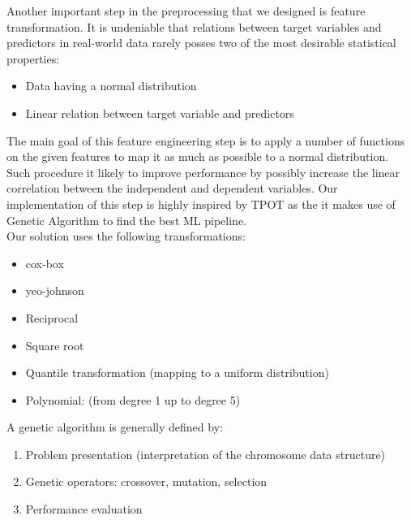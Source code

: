 \documentclass[conference]{IEEEtran}
\begin{document}
Another important step in the preprocessing that we designed is feature transformation. It is undeniable that relations between target variables and predictors in real-world data rarely posses two of the most desirable statistical properties:
\begin{itemize}
	\item Data having a normal distribution
	\item Linear relation between target variable and predictors
\end{itemize}
The main goal of this feature engineering step is to apply a number of functions on the given features to map it as much as possible to a normal distribution. Such procedure it likely to improve performance by possibly increase the linear correlation between the independent and dependent variables. Our implementation of this step is highly inspired by TPOT as the it makes use of Genetic Algorithm to find the best ML pipeline.\\

Our solution uses the following transformations:
\begin{itemize}
	\item cox-box
	\item yeo-johnson
	\item Reciprocal
	\item Square root
	\item Quantile transformation (mapping to a uniform distribution)
	\item Polynomial: (from degree 1 up to degree 5)
\end{itemize}

A genetic algorithm is generally defined by: 
\begin{enumerate}
	\item Problem presentation (interpretation of the chromosome data structure)
	\item Genetic operators: crossover, mutation, selection 
	\item Performance evaluation
\end{enumerate}
\end{document}
